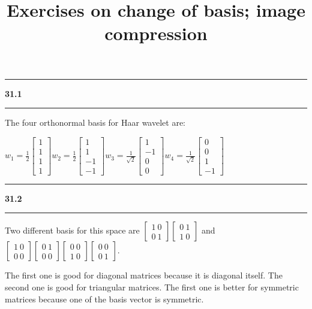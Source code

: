 \documentclass[11pt]{article}
\newcommand\question[2]{\vspace{.25in}\hrule\textbf{#1 #2}\vspace{.5em}\hrule\vspace{.10in}}
\begin{document}
\raggedright
\newcommand\NAME{Haiying Cui}  %
\newcommand\ANDREWID{Christy}     %
\newcommand\HWNUM{31}              %

\title{Exercises on change of basis; image compression}
\maketitle

\question{31.1}{}
The four orthonormal basis for Haar wavelet are:

\(w_1 = \frac{1}{2}\begin{bmatrix} 1 \\ 1 \\ 1 \\ 1 \end{bmatrix}  w_2 = \frac{1}{2}\begin{bmatrix} 1 \\ 1 \\ -1 \\ -1 \end{bmatrix}  w_3 = \frac{1}{\sqrt{2}}\begin{bmatrix} 1 \\ -1 \\ 0 \\ 0 \end{bmatrix} w_4 = \frac{1}{\sqrt{2}}\begin{bmatrix} 0 \\ 0 \\ 1 \\ -1 \end{bmatrix}\)

\question{31.2}{}
Two different basis for this space are \(\begin{bmatrix} 1 \ 0 \\ 0 \ 1 \end{bmatrix}\begin{bmatrix} 0 \ 1 \\ 1 \ 0 \end{bmatrix}\) and \(\begin{bmatrix} 1 \ 0 \\ 0 \ 0 \end{bmatrix}\begin{bmatrix} 0 \ 1 \\ 0 \ 0 \end{bmatrix}\begin{bmatrix} 0 \ 0 \\ 1 \ 0 \end{bmatrix}\begin{bmatrix} 0 \ 0 \\ 0 \ 1 \end{bmatrix}\). 

The first one is good for diagonal matrices because it is diagonal itself. The second one is good for triangular matrices. The first one is better for symmetric matrices because one of the basis vector is symmetric.
\end{document}
